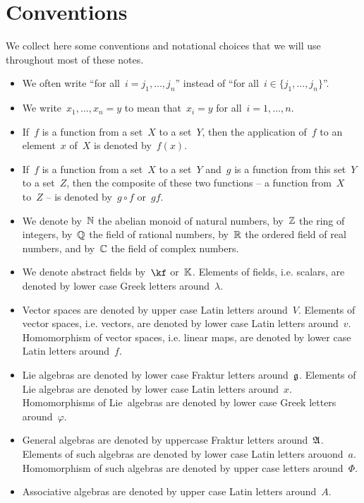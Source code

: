 \chapter{Conventions}

We collect here some conventions and notational choices that we will use throughout most of these notes.

\begin{itemize}
	\item
		We often write \enquote{for all~$i = j_1, \dotsc, j_n$} instead of \enquote{for all~$i \in \{ j_1, \dotsc, j_n \}$}.
	\item
		We write~$x_1, \dotsc, x_n = y$ to mean that~$x_i = y$ for all~$i = 1, \dotsc, n$.
	\item
		If~$f$ is a function from a set~$X$ to a set~$Y$, then the application of~$f$ to an element~$x$ of~$X$ is denoted by~$f(x)$.
	\item
		If~$f$ is a function from a set~$X$ to a set~$Y$ and~$g$ is a function from this set~$Y$ to a set~$Z$, then the composite of these two functions -- a function from~$X$ to~$Z$ -- is denoted by~$g \circ f$ or~$gf$.
	\item
		We denote by~$\mathbb{N}$ the abelian monoid of natural numbers, by~$\mathbb{Z}$ the ring of integers, by~$\mathbb{Q}$ the field of rational numbers, by~$\mathbb{R}$ the ordered field of real numbers, and by~$\mathbb{C}$ the field of complex numbers.
	\item
		We denote abstract fields by~$\kf$ or~$\mathbb{K}$.
		Elements of fields, i.e. scalars, are denoted by lower case Greek letters around~$\lambda$.
	\item
		Vector spaces are denoted by upper case Latin letters around~$V$.
		Elements of vector spaces, i.e. vectors, are denoted by lower case Latin letters around~$v$.
		Homomorphism of vector spaces, i.e. linear maps, are denoted by lower case Latin letters around~$f$.
	\item
		Lie algebras are denoted by lower case Fraktur letters around~$\mathfrak{g}$.
		Elements of Lie algebras are denoted by lower case Latin letters around~$x$.
		Homomorphisms of Lie~algebras are denoted by lower case Greek letters around~$\varphi$.
	\item
		General algebras are denoted by uppercase Fraktur letters around~$\mathfrak{A}$.
		Elements of such algebras are denoted by lower case Latin letters arouond~$a$.
		Homomorphism of such algebras are denoted by upper case letters around~$\Phi$.
	\item
		Associative algebras are denoted by upper case Latin letters around~$A$.

\end{itemize}
